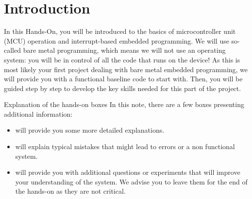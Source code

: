 \section*{Introduction}

In this Hands-On, you will be introduced to the basics of microcontroller unit (MCU) operation and interrupt-based embedded programming. We will use so-called bare metal programming, which means we will not use an operating system: you will be in control of all the code that runs on the device! As this is most likely your first project dealing with bare metal embedded programming, we will provide you with a functional baseline code to start with. Then, you will be guided step by step to develop the key skills needed for this part of the project.
\begin{bclogo}[couleur = gray!20, arrondi = 0.2, logo=\bcinfo]{Explanation of the hands-on boxes}
In this note, there are a few boxes presenting additional information:
\begin{itemize}
    \item \bcinfo will provide you some more detailed explanations.
    \item \bcattention will explain typical mistakes that might lead to errors or a non functional system.
    \item \bcquestion will provide you with additional questions or experiments that will improve your understanding of the system. We advise you to leave them for the end of the hands-on as they are not critical.
\end{itemize}
\end{bclogo}
